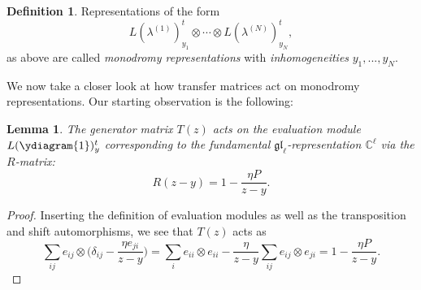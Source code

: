 \documentclass[11pt]{report}
\newtheorem{lemma}[theorem]{Lemma}
\theoremstyle{definition}
\newtheorem{definition}[theorem]{Definition}
\theoremstyle{remark}
\theoremstyle{remark}
\newcommand{\C}{\mathbb{C}}
\begin{document}
\begin{definition}
Representations of the form
\begin{equation*}
L(\lambda^{(1)})_{y_1}^t \otimes \cdots \otimes L(\lambda^{(N)})_{y_N}^t,
\end{equation*}
as above are called \emph{monodromy representations} with \emph{inhomogeneities} $y_1,...,y_N$. %
\end{definition}

We now take a closer look at how transfer matrices act on monodromy representations. Our starting observation is the following:

\begin{lemma}
The generator matrix $T(z)$ acts on the evaluation module $L(\ydiagram{1})_y^t$ corresponding to the fundamental $\mathfrak{gl}_\ell$-representation $\C^\ell$ via the $R$-matrix:
\begin{equation*}
R(z-y) = 1 - \frac{\eta P}{z-y}.
\end{equation*}
\end{lemma}

\begin{proof}
Inserting the definition of evaluation modules as well as the transposition and shift automorphisms, we see that $T(z)$ acts as
\begin{equation*}
\sum_{ij} e_{ij} \otimes \bigg( \delta_{ij} - \frac{\eta e_{ji}}{z-y} \bigg)
= \sum_{i} e_{ii} \otimes e_{ii} - \frac{\eta}{z-y} \sum_{ij} e_{ij} \otimes e_{ji} = 1 - \frac{\eta P}{z-y}.
\end{equation*}
\end{proof}
\end{document}

